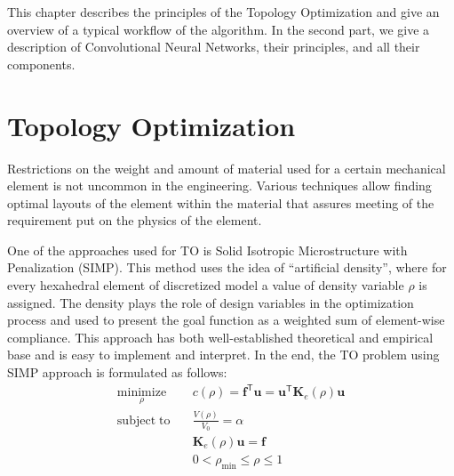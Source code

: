 
\label{chapter:Introduction}

This chapter describes the principles of the Topology Optimization and give an overview of a typical workflow of the algorithm. 
In the second part, we give a description of Convolutional Neural Networks, their principles, and all their components.


\chapter{Topology Optimization}

Restrictions on the weight and amount of material used for a certain mechanical element is not uncommon in the engineering.
Various techniques allow finding optimal layouts of the element within the material that assures meeting of the requirement put on the physics of the element. 
\medskip

One of the approaches used for TO is Solid Isotropic Microstructure with Penalization (SIMP).
This method uses the idea of ``artificial density''\cite{to_simp}, where for every hexahedral element of discretized model a value of density variable $\rho$ is assigned.
The density plays the role of design variables in the optimization process and used to present the goal function as a weighted sum of element-wise compliance.
This approach has both well-established theoretical and empirical base and is easy to implement and interpret.
In the end, the TO problem using SIMP approach is formulated as follows:
\begin{align*}
	\underset{\rho}{\mathrm{minimize}} \quad & c(\rho) = \mathbf{f}^{\mathsf{T}} \mathbf{u} = \mathbf{u}^{\mathsf{T}} \mathbf{K}_{e}(\rho) \mathbf{u} \\
	\mathrm{subject \; to} \quad & \frac{V(\rho)}{V_{0}} = \alpha \\
	& \mathbf{K}_{e}(\rho) \mathbf{u} = \mathbf{f} \\
	& 0 < \rho_{\min} \leq \rho \leq 1
\end{align*} 

